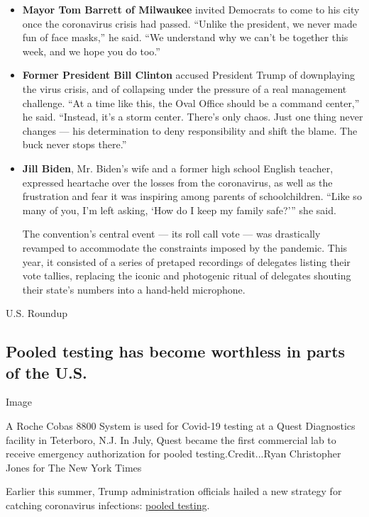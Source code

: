 \begin{itemize}
\item
  \textbf{Mayor Tom Barrett of Milwaukee} invited Democrats to come to
  his city once the coronavirus crisis had passed. ``Unlike the
  president, we never made fun of face masks,'' he said. ``We understand
  why we can't be together this week, and we hope you do too.''
\item
  \textbf{Former President Bill Clinton} accused President Trump of
  downplaying the virus crisis, and of collapsing under the pressure of
  a real management challenge. ``At a time like this, the Oval Office
  should be a command center,'' he said. ``Instead, it's a storm center.
  There's only chaos. Just one thing never changes --- his determination
  to deny responsibility and shift the blame. The buck never stops
  there.''
\item
  \textbf{Jill Biden}, Mr. Biden's wife and a former high school English
  teacher, expressed heartache over the losses from the coronavirus, as
  well as the frustration and fear it was inspiring among parents of
  schoolchildren. ``Like so many of you, I'm left asking, `How do I keep
  my family safe?''' she said.

  The convention's central event --- its roll call vote --- was
  drastically revamped to accommodate the constraints imposed by the
  pandemic. This year, it consisted of a series of pretaped recordings
  of delegates listing their vote tallies, replacing the iconic and
  photogenic ritual of delegates shouting their state's numbers into a
  hand-held microphone.
\end{itemize}

U.S. Roundup

\hypertarget{pooled-testing-has-become-worthless-in-parts-of-the-us}{%
\subsection{Pooled testing has become worthless in parts of the
U.S.}\label{pooled-testing-has-become-worthless-in-parts-of-the-us}}

Image

A Roche Cobas 8800 System is used for Covid-19 testing at a Quest
Diagnostics facility in Teterboro, N.J. In July, Quest became the first
commercial lab to receive emergency authorization for pooled
testing.Credit...Ryan Christopher Jones for The New York Times

Earlier this summer, Trump administration officials hailed a new
strategy for catching coronavirus infections:
\href{https://www.nytimes3xbfgragh.onion/2020/07/01/health/coronavirus-pooled-testing.html}{pooled
testing}.


